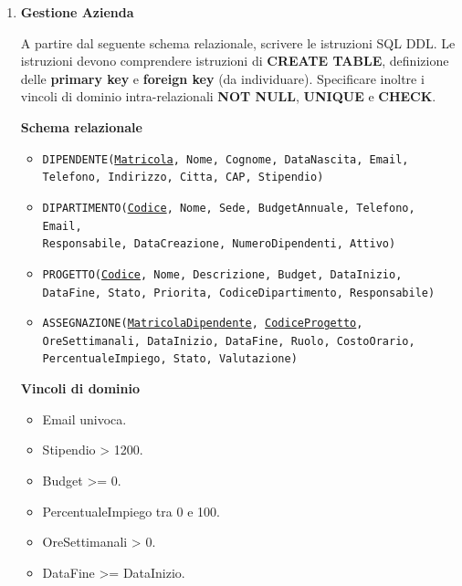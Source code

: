 \documentclass[a4paper,12pt]{article}
\begin{document}
\begin{enumerate}
\textbf{Vincoli di dominio}
\begin{itemize}
\item Email univoca.
\item Stipendio > 1500.
\item NumeroPostiLetto > 0.
\item BudgetAnnuale >= 0.
\item DataDimissione >= DataIngresso.
\item CostoTotale >= 0.
\end{itemize}
\newpage

\item \textbf{Gestione Azienda}

A partire dal seguente schema relazionale, scrivere le istruzioni SQL DDL.
Le istruzioni devono comprendere istruzioni di \textbf{CREATE TABLE}, definizione delle \textbf{primary key} e \textbf{foreign key} (da individuare). Specificare inoltre i vincoli di dominio intra-relazionali \textbf{NOT NULL}, \textbf{UNIQUE} e \textbf{CHECK}.

\textbf{Schema relazionale}
\begin{itemize}
    \item \texttt{DIPENDENTE(\underline{Matricola}, Nome, Cognome, DataNascita, Email, Telefono, Indirizzo, Citta, CAP, Stipendio)}
    \item \texttt{DIPARTIMENTO(\underline{Codice}, Nome, Sede, BudgetAnnuale, Telefono, Email,\\ Responsabile, DataCreazione, NumeroDipendenti, Attivo)}
    \item \texttt{PROGETTO(\underline{Codice}, Nome, Descrizione, Budget, DataInizio, DataFine, Stato, Priorita, CodiceDipartimento, Responsabile)}
    \item \texttt{ASSEGNAZIONE(\underline{MatricolaDipendente}, \underline{CodiceProgetto}, OreSettimanali, DataInizio, DataFine, Ruolo, CostoOrario, PercentualeImpiego, Stato, Valutazione)}
\end{itemize}

\textbf{Vincoli di dominio}
\begin{itemize}
\item Email univoca.
\item Stipendio > 1200.
\item Budget >= 0.
\item PercentualeImpiego tra 0 e 100.
\item OreSettimanali > 0.
\item DataFine >= DataInizio.
\end{itemize}
\newpage

\end{enumerate}
\end{document}
